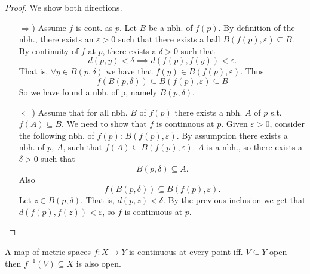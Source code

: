 \begin{proof}
  We show both directions.
   \begin{enumerate}
     \item[\( \Rightarrow \))] Assume \( f \) is cont. as \( p \). Let \( B \) be a nbh. of \( f(p) \).
       By definition of the nbh., there exists an \( \varepsilon > 0 \)
       such that there exists a ball \( B(f(p), \varepsilon) \subseteq B \).
       By continuity of \( f \) at \( p \), there exists a \( \delta > 0 \) such that
       \[
         d(p, y) < \delta \implies d(f(p), f(y)) < \varepsilon.
       \]
       That is, \( \forall y \in B(p, \delta) \)
       we have that \( f(y) \in B(f(p), \varepsilon) \). Thus
       \[
        f(B(p, \delta)) \subseteq B(f(p), \varepsilon) \subseteq B
       \]
       So we have found a nbh. of p, namely \( B(p, \delta) \).

     \item[\( \Leftarrow \))] Assume that for all nbh. \( B \) of \( f(p) \)
        there exists a nbh. \( A \) of \( p \) s.t. \( f(A) \subseteq B \).
        We need to show that \( f \) is continuous at \( p \).
        Given \( \varepsilon > 0 \), consider the following nbh. of \( f(p) \):
        \( B(f(p), \varepsilon) \). By assumption there exists a nbh. of \( p \), \( A \),
        such that \( f(A) \subseteq B(f(p), \varepsilon) \).
        \( A \) is a nbh., so there exists a \( \delta > 0 \) such that
        \[
          B(p, \delta) \subseteq A.
        \]
        Also 
        \[
          f(B(p, \delta)) \subseteq B(f(p), \varepsilon).
        \]
        Let \( z \in B(p, \delta) \). That is, \( d(p, z) < \delta \).
        By the previous inclusion we get that \( d(f(p), f(z)) < \varepsilon \),
        so \( f \) is continuous at \( p \).
   \end{enumerate}
\end{proof}

\begin{theorem}
   A map of metric spaces \( f: X \to Y \) is continuous
   at every point iff. \( V \subseteq Y \) open then 
   \( {f}^{-1} (V) \subseteq X \) is also open.
\end{theorem}

